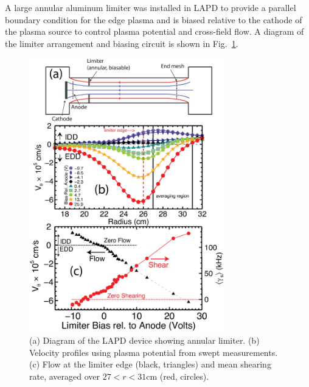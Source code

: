 \documentclass[aip,pop,amsmath,amssymb,preprint,superscriptaddress]{revtex4-1} %
\begin{document}
A large annular aluminum limiter was installed in LAPD to provide a parallel boundary condition for the edge plasma and is biased relative to the cathode of the plasma source to control plasma potential and cross-field flow.  A diagram of the limiter arrangement and biasing circuit is shown in Fig.~\ref{fig:velocity_flowshear}.

\begin{figure}[!htbp]
\centerline{
\includegraphics[width=8.5cm]{figure1.eps}}
\caption{\label{fig:velocity_flowshear} (a) Diagram of the LAPD device showing annular limiter.  (b) Velocity profiles using plasma potential from swept measurements. (c) Flow at the limiter edge (black, triangles) and mean shearing rate, averaged over $27 < r < 31$cm (red, circles).}
\end{figure}
\end{document}
